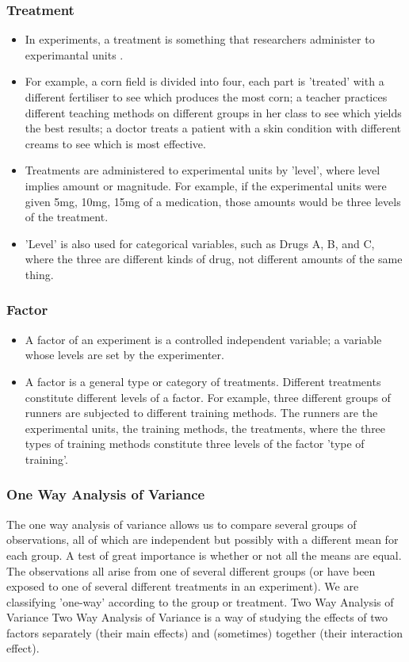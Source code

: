 \subsubsection*{Treatment}
\begin{itemize}
\item In experiments, a treatment is something that researchers administer to experimantal units . 
\item For example, a corn field is divided into four, each part is 'treated' with a different fertiliser to see which produces the most corn; a teacher practices different teaching methods on different groups in her class to see which yields the best results; a doctor treats a patient with a skin condition with different creams to see which is most effective.
\item Treatments are administered to experimental units by 'level', where level implies amount or magnitude. For example, if the experimental units were given 5mg, 10mg, 15mg of a medication, those amounts would be three levels of the treatment. 
\item 'Level' is also used for categorical variables, such as Drugs A, B, and C, where the three are different kinds of drug, not different amounts of the same thing.
\end{itemize}
\subsubsection*{Factor}
\begin{itemize}
\item A factor of an experiment is a controlled independent variable; a variable whose levels are set by the experimenter.
\item A factor is a general type or category of treatments. Different treatments constitute different levels of a factor. For example, three different groups of runners are subjected to different training methods. The runners are the experimental units, the training methods, the treatments, where the three types of training methods constitute three levels of the factor 'type of training'.

\end{itemize}

\subsubsection*{One Way Analysis of Variance }
The one way analysis of variance allows us to compare several groups of observations, all of which are independent but possibly with a different mean for each group. A test of great importance is whether or not all the means are equal.
The observations all arise from one of several different groups (or have been exposed to one of several different treatments in an experiment). We are classifying 'one-way' according to the group or treatment.
Two Way Analysis of Variance 
Two Way Analysis of Variance is a way of studying the effects of two factors separately (their main effects) and (sometimes) together (their interaction effect).

